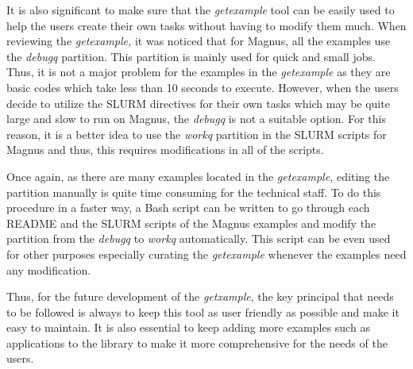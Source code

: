 It is also significant to make sure that the \emph{getexample} tool can be easily used to help the users create their own tasks without having to modify them
much. When reviewing the \emph{getexample,} it was noticed that for Magnus, all the examples use the \emph{debugq} partition. This partition is mainly used
for quick and small jobs. Thus, it is not a major problem for the examples in the \emph{getexample} as they are basic codes which take less than 10 seconds 
to execute. However, when the users decide to utilize the SLURM directives for their own tasks which may be quite large and slow to run on Magnus, the 
\emph{debugq} is not a suitable option. For this reason, it is a better idea to use the \emph{workq} partition in the SLURM scripts for Magnus and thus,
this requires modifications in all of the scripts.

Once again, as there are many examples located in the \emph{getexample,} editing the partition manually is quite time consuming for the technical staff. To do 
this procedure in a faster way, a Bash script can be written to go through each README and the SLURM scripts of the Magnus examples and modify the 
partition from the \emph{debugq} to \emph{workq} automatically. This script can be even used for other purposes especially curating the \emph{getexample} 
whenever the examples need any modification.   

Thus, for the future development of the \emph{getxample}, the key principal that needs to be followed is always to keep this tool as user friendly as possible 
and make it easy to maintain. It is also essential to keep adding more examples such as applications to the library to make it more comprehensive for 
the needs of the users. 
